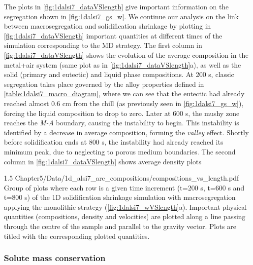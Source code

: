 The plots in \cref{fig:1dalsi7_dataVSlength} give important information on the segregation shown in  \cref{fig:1dalsi7_gs_w}.
We continue our analysis on the link between macrosegregation and solidification shrinkage by plotting in \cref{fig:1dalsi7_dataVSlength} important 
quantities at different times of the simulation corresponding to the MD strategy.
The first column in \cref{fig:1dalsi7_dataVSlength} shows the evolution of the average composition in the metal+air system 
(same plot as in \cref{fig:1dalsi7_dataVSlength}a), as well as the solid (primary and eutectic) and liquid phase compositions. 
At 200 s, classic segregation takes place governed by the alloy properties defined in \cref{table:1dalsi7_macro_diagram},
where we can see that the eutectic had already reached almost 0.6 cm from the chill (as previously seen in \cref{fig:1dalsi7_gs_w}), 
forcing the liquid composition to drop to zero.
Later at 600 s, the mushy zone reaches the \emph{M-A} boundary, causing the instability to begin. This instability is identified by
a decrease in average composition, forming the \emph{valley} effect. Shortly before solidification ends at 800 s, the instability had
already reached its minimum peak, due to neglecting to porous medium boundaries. 
The second column in \cref{fig:1dalsi7_dataVSlength} shows average density plots

\begin{landscape}
\begin{figureth}
{1.5}
{Chapter5/Data/1d_alsi7_arc_compositions/compositions_vs_length.pdf}
{Group of plots where each row is a given time increment (t=200 s, t=600 s and t=800 s) of the 1D solidification shrinkage simulation with macrosegregation
applying the monolithic strategy (\cref{fig:1dalsi7_wVSlength}a). 
Important physical quantities (compositions, density and velocities) are plotted along a line passing through the centre of the sample and parallel to the gravity vector. 
Plots are titled with the corresponding plotted quantities.}
\label{fig:1dalsi7_dataVSlength}
\end{figureth}
\end{landscape}



\subsubsection{Solute mass conservation}

